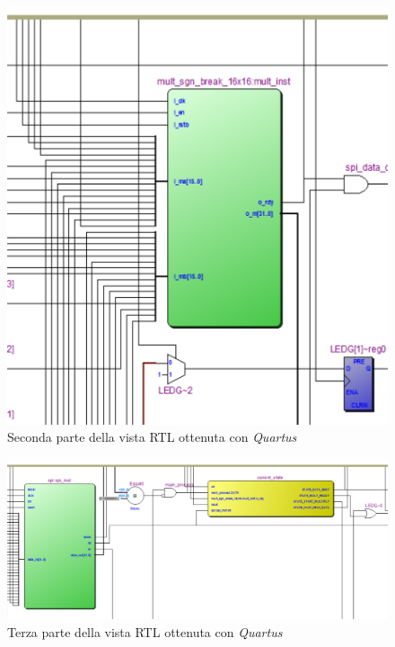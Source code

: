 \documentclass[titlepage]{report}
\begin{document}
			\begin{figure}[H]
				\centering
				\includegraphics[scale=0.4]{./img/quartus_rtl_viewer_2.png}
				\caption{Seconda parte della vista RTL ottenuta con \textit{Quartus}}
				\label{fig:rtl_quartus_2}
			\end{figure}	

			\begin{figure}[H]
				\centering
				\includegraphics[scale=0.4]{./img/quartus_rtl_viewer_3.png}
				\caption{Terza parte della vista RTL ottenuta con \textit{Quartus}}
				\label{fig:rtl_quartus_3}
			\end{figure}	
\end{document}
